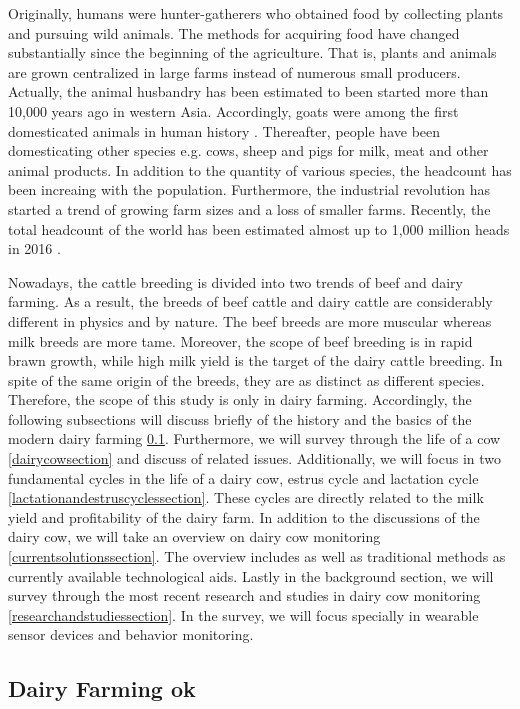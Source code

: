 \documentclass[english,12pt,a4paper,pdftex,elec,utf8]{aaltothesis}
\begin{document}
Originally, humans were hunter-gatherers who obtained food by collecting plants and pursuing wild animals. The methods for acquiring food have changed substantially since the beginning of the agriculture. That is, plants and animals are grown centralized in large farms instead of numerous small producers. Actually, the animal husbandry has been estimated to been started more than 10,000 years ago in western Asia. Accordingly, goats were among the first domesticated animals in human history \cite{ancienthistoryofmilk}. Thereafter, people have been domesticating other species e.g. cows, sheep and pigs for milk, meat and other animal products. In addition to the quantity of various species, the headcount has been increaing with the population. Furthermore, the industrial revolution has started a trend of growing farm sizes and a loss of smaller farms. Recently, the total headcount of the world has been estimated almost up to 1,000 million heads in 2016 \cite{livestockandpoultry}.

Nowadays, the cattle breeding is divided into two trends of beef and dairy farming. As a result, the breeds of beef cattle and dairy cattle are considerably different in physics and by nature. The beef breeds are more muscular whereas milk breeds are more tame. Moreover, the scope of beef breeding is in rapid brawn growth, while high milk yield is the target of the dairy cattle breeding. In spite of the same origin of the breeds, they are as distinct as different species. Therefore, the scope of this study is only in dairy farming. Accordingly, the following subsections will discuss briefly of the history and the basics of the modern dairy farming \ref{dairyfarmingsection}. Furthermore, we will survey through the life of a cow \ref{dairycowsection} and discuss of related issues. Additionally, we will focus in two fundamental cycles in the life of a dairy cow, estrus cycle and lactation cycle \ref{lactationandestruscyclessection}. These cycles are directly related to the milk yield and profitability of the dairy farm. In addition to the discussions of the dairy cow, we will take an overview on dairy cow monitoring \ref{currentsolutionssection}. The overview includes as well as traditional methods as currently available technological aids. Lastly in the background section, we will survey through the most recent research and studies in dairy cow monitoring \ref{researchandstudiessection}. In the survey, we will focus specially in wearable sensor devices and behavior monitoring.


\subsection{Dairy Farming ok} \label{dairyfarmingsection}
\end{document}
